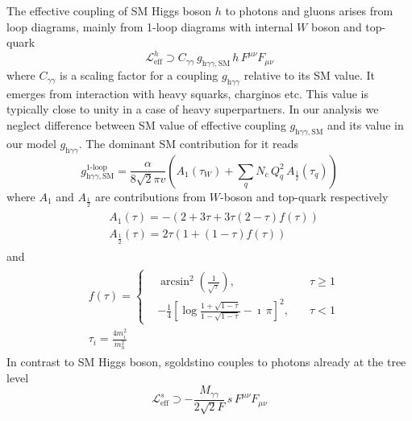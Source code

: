\documentclass[10pt]{article}
\begin{document}
\noindent
The effective coupling of SM Higgs boson $h$ to photons and gluons arises from loop diagrams, mainly from 1-loop diagrams with internal $W$ boson and top-quark
\begin{equation}
\label{Leffh}
\mathcal{L}_{\text{eff}}^h \supset C_{\gamma \gamma} \, g_{\text{h}\gamma \gamma,\text{SM}} \, h \, F^{\mu \nu} F_{\mu \nu}
\end{equation}
where $C_{\gamma \gamma}$ is a scaling factor for a coupling $g_{\text{h}\gamma \gamma}$ relative to its SM value. It emerges from interaction with heavy squarks, charginos etc. This value is typically close to unity in a case of heavy superpartners. In our analysis we neglect difference between SM value of effective coupling $g_{\text{h}\gamma \gamma,\text{SM}}$ and its value in our model $g_{\text{h}\gamma \gamma}$.
The dominant SM contribution for it reads
\begin{equation}
\label{loops}
g_{\text{h}\gamma \gamma,\text{SM}}^{\text{1-loop}} = \frac{\alpha}{8\sqrt{2}\pi v} \left(A_{1}(\tau_W)+\sum_{q} N_c \, Q_q^2 \, A_{\frac{1}{2}}(\tau_q)\right)
\end{equation}
where $A_1$ and $A_{\frac{1}{2}}$ are contributions from $W$-boson and top-quark respectively
\begin{eqnarray}
\label{A1A12}
\begin{aligned}
& A_1(\tau) = -(2+3\tau+3\tau(2-\tau) f(\tau)) \\
& A_{\frac{1}{2}}(\tau) = 2\tau (1+(1-\tau) f(\tau))
\end{aligned}
\end{eqnarray}
and 
\begin{eqnarray}
\label{ftau}
\begin{aligned}
& f(\tau) = \left\{
\begin{aligned}
& \arcsin^2 \left(\frac{1}{\sqrt{\tau}}\right), & \quad \tau \geq 1 \\
& -\frac{1}{4} \left[\log \frac{1+\sqrt{1-\tau}}{1-\sqrt{1-\tau}}-\imath \, \pi\right]^2, & \quad \tau < 1 
\end{aligned}
\right.  \\
& \tau_i = \frac{4 m_i^2}{m_h^2}
\end{aligned}
\end{eqnarray}
In contrast to SM Higgs boson, sgoldstino couples to photons already at the tree level
\begin{equation}
\label{Leffs}
\mathcal{L}_{\text{eff}}^s \supset -\frac{M_{\gamma \gamma}}{2\sqrt{2}F} \, s \, F^{\mu \nu} F_{\mu \nu} 
\end{equation}
\end{document}
